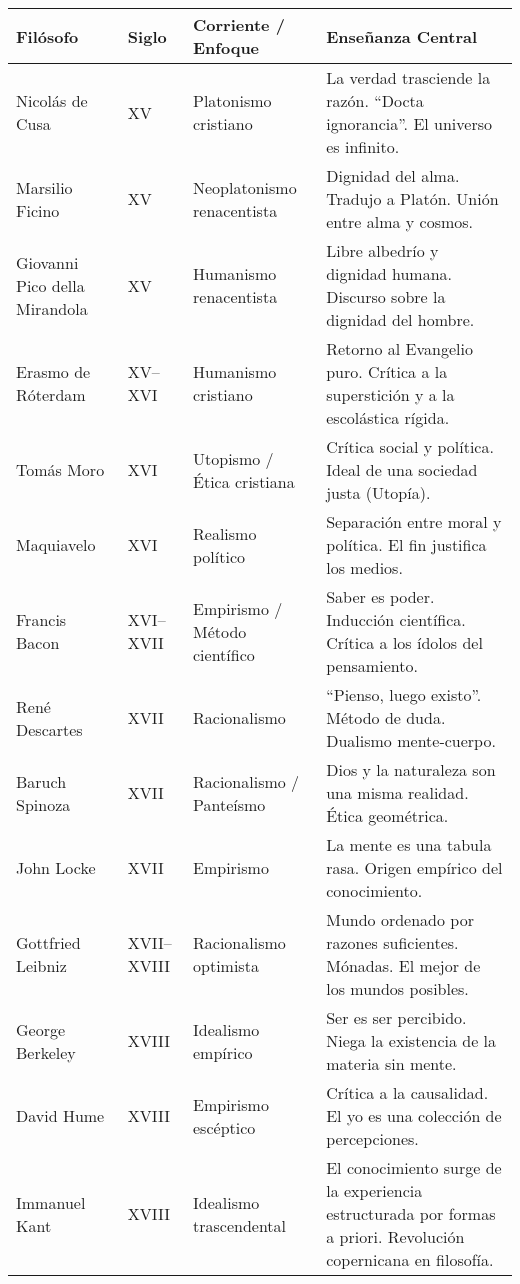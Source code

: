 \documentclass[12pt]{article}
\begin{document}
\begin{tabularx}{\textwidth}{@{} l l l X @{}}
\toprule
\textbf{Filósofo} & \textbf{Siglo} & \textbf{Corriente / Enfoque} & \textbf{Enseñanza Central} \\
\midrule
Nicolás de Cusa         & XV           & Platonismo cristiano        & La verdad trasciende la razón. “Docta ignorancia”. El universo es infinito. \\
Marsilio Ficino         & XV           & Neoplatonismo renacentista  & Dignidad del alma. Tradujo a Platón. Unión entre alma y cosmos. \\
Giovanni Pico della Mirandola & XV     & Humanismo renacentista      & Libre albedrío y dignidad humana. Discurso sobre la dignidad del hombre. \\
Erasmo de Róterdam      & XV–XVI       & Humanismo cristiano         & Retorno al Evangelio puro. Crítica a la superstición y a la escolástica rígida. \\
Tomás Moro              & XVI          & Utopismo / Ética cristiana  & Crítica social y política. Ideal de una sociedad justa (Utopía). \\
Maquiavelo              & XVI          & Realismo político           & Separación entre moral y política. El fin justifica los medios. \\
Francis Bacon           & XVI–XVII     & Empirismo / Método científico & Saber es poder. Inducción científica. Crítica a los ídolos del pensamiento. \\
René Descartes          & XVII         & Racionalismo                & “Pienso, luego existo”. Método de duda. Dualismo mente-cuerpo. \\
Baruch Spinoza          & XVII         & Racionalismo / Panteísmo    & Dios y la naturaleza son una misma realidad. Ética geométrica. \\
John Locke              & XVII         & Empirismo                   & La mente es una tabula rasa. Origen empírico del conocimiento. \\
Gottfried Leibniz       & XVII–XVIII   & Racionalismo optimista      & Mundo ordenado por razones suficientes. Mónadas. El mejor de los mundos posibles. \\
George Berkeley         & XVIII        & Idealismo empírico          & Ser es ser percibido. Niega la existencia de la materia sin mente. \\
David Hume              & XVIII        & Empirismo escéptico         & Crítica a la causalidad. El yo es una colección de percepciones. \\
Immanuel Kant           & XVIII        & Idealismo trascendental     & El conocimiento surge de la experiencia estructurada por formas a priori. Revolución copernicana en filosofía. \\
\bottomrule
\end{tabularx}
\end{document}
